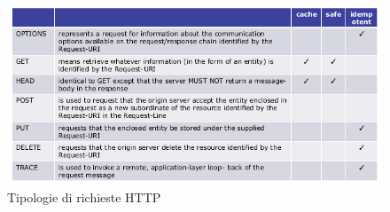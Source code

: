 \message{ !name(sd.tex)}\documentclass[a4paper,12pt, oneside]{book}
\begin{document}
\begin{figure}
    \caption{Tipologie di richieste HTTP}
    \label{fig:httpMethod}
	\includegraphics[scale=0.7]{img/http.png}
\end{figure}
\end{document}
